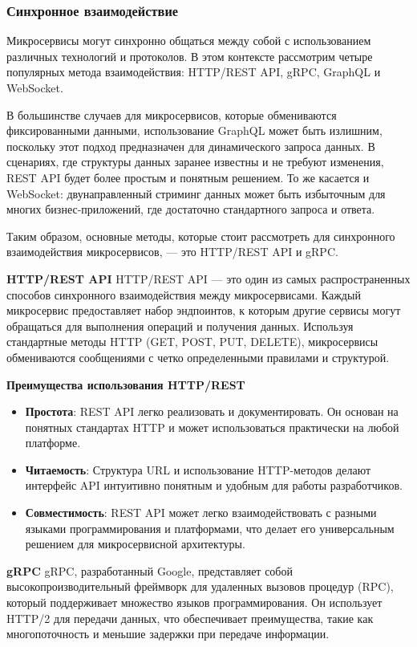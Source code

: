 \subsubsection{Синхронное взаимодействие}

Микросервисы могут синхронно общаться между собой с использованием различных технологий и протоколов. 
В этом контексте рассмотрим четыре популярных метода взаимодействия: HTTP/REST API, gRPC, GraphQL и WebSocket.

В большинстве случаев для микросервисов, которые обмениваются фиксированными данными, использование GraphQL 
может быть излишним, поскольку этот подход предназначен для динамического запроса данных. В сценариях, 
где структуры данных заранее известны и не требуют изменения, REST API будет более простым и 
понятным решением. То же касается и WebSocket: двунаправленный стриминг данных может быть избыточным для 
многих бизнес-приложений, где достаточно стандартного запроса и ответа.

Таким образом, основные методы, которые стоит рассмотреть для синхронного взаимодействия микросервисов, — 
это HTTP/REST API и gRPC.


\textbf{HTTP/REST API}
HTTP/REST API — это один из самых распространенных способов синхронного взаимодействия между микросервисами. Каждый микросервис предоставляет набор эндпоинтов, к которым другие сервисы могут обращаться для выполнения операций и получения данных. Используя стандартные методы HTTP (GET, POST, PUT, DELETE), микросервисы обмениваются сообщениями с четко определенными правилами и структурой.


\textbf{Преимущества использования HTTP/REST}
\begin{itemize}
    \item \textbf{Простота}: REST API легко реализовать и документировать. Он основан на понятных стандартах HTTP и может использоваться практически на любой платформе.
    \item \textbf{Читаемость}: Структура URL и использование HTTP-методов делают интерфейс API интуитивно понятным и удобным для работы разработчиков.
    \item \textbf{Совместимость}: REST API может легко взаимодействовать с разными языками программирования и платформами, что делает его универсальным решением для микросервисной архитектуры.
\end{itemize}


\textbf{gRPC}
gRPC, разработанный Google, представляет собой высокопроизводительный фреймворк для удаленных вызовов процедур (RPC), который поддерживает множество языков программирования. Он использует HTTP/2 для передачи данных, что обеспечивает преимущества, такие как многопоточность и меньшие задержки при передаче информации.


